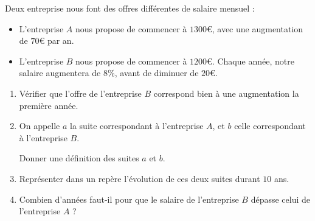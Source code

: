 \documentclass[
	classe=$1^{ere}STI2D$
]{évaluation}
\begin{document}
\begin{exercice}[5]
	Deux entreprise nous font des offres différentes de salaire mensuel :
	\begin{itemize}
		\item L'entreprise $A$ nous propose de commencer à $1300$€, avec une augmentation de $70$€ par an.
		\item L'entreprise $B$ nous propose de commencer à $1200$€. Chaque année, notre salaire augmentera de $8$\%, avant de diminuer de $20$€.
	\end{itemize}
	\begin{enumerate}
		\item Vérifier que l'offre de l'entreprise $B$ correspond bien à une augmentation la première année.
		\item On appelle $a$ la suite correspondant à l'entreprise $A$, et $b$ celle correspondant à l'entreprise $B$.

		      Donner une définition des suites $a$ et $b$.
		\item Représenter dans un repère l'évolution de ces deux suites durant $10$ ans.

		\item Combien d'années faut-il pour que le salaire de l'entreprise $B$ dépasse celui de l'entreprise $A$ ?
	\end{enumerate}
\end{exercice}
\end{document}
